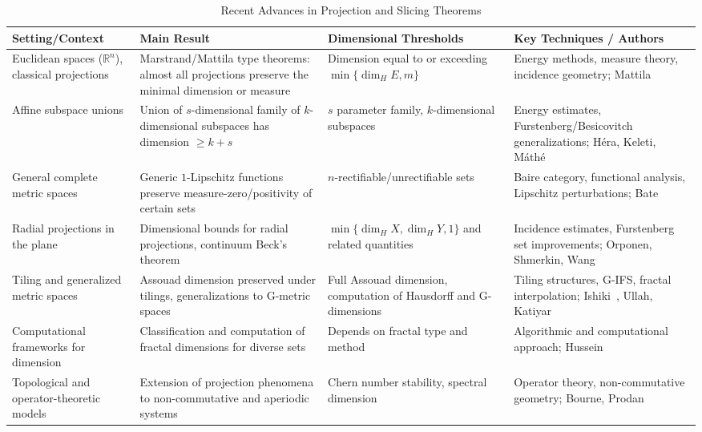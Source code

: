 \documentclass[sigconf]{acmart}
\begin{document}
\begin{table*}[htbp]
\centering
\caption{Recent Advances in Projection and Slicing Theorems}
\label{tab:proj_slice_advances}
\begin{adjustbox}{max width=\textwidth}
\begin{tabular}{@{}llll@{}}
\toprule
\textbf{Setting/Context} & \textbf{Main Result} & \textbf{Dimensional Thresholds} & \textbf{Key Techniques / Authors} \\
\midrule
Euclidean spaces ($\mathbb{R}^n$), classical projections & Marstrand/Mattila type theorems: almost all projections preserve the minimal dimension or measure & Dimension equal to or exceeding $\min\{\dim_H E, m\}$ & Energy methods, measure theory, incidence geometry; Mattila~\cite{ref74} \\
Affine subspace unions & Union of $s$-dimensional family of $k$-dimensional subspaces has dimension $\geq k+s$ & $s$ parameter family, $k$-dimensional subspaces & Energy estimates, Furstenberg/Besicovitch generalizations; Héra, Keleti, Máthé~\cite{ref75} \\
General complete metric spaces & Generic $1$-Lipschitz functions preserve measure-zero/positivity of certain sets & $n$-rectifiable/unrectifiable sets & Baire category, functional analysis, Lipschitz perturbations; Bate~\cite{ref43} \\
Radial projections in the plane & Dimensional bounds for radial projections, continuum Beck’s theorem & $\min\{\dim_H X, \dim_H Y, 1\}$ and related quantities & Incidence estimates, Furstenberg set improvements; Orponen, Shmerkin, Wang~\cite{ref92} \\
Tiling and generalized metric spaces & Assouad dimension preserved under tilings, generalizations to G-metric spaces & Full Assouad dimension, computation of Hausdorff and G-dimensions & Tiling structures, G-IFS, fractal interpolation; Ishiki~\cite{ref1}, Ullah, Katiyar~\cite{ref6} \\
Computational frameworks for dimension & Classification and computation of fractal dimensions for diverse sets & Depends on fractal type and method & Algorithmic and computational approach; Hussein~\cite{ref30} \\
Topological and operator-theoretic models & Extension of projection phenomena to non-commutative and aperiodic systems & Chern number stability, spectral dimension & Operator theory, non-commutative geometry; Bourne, Prodan~\cite{ref23} \\
\bottomrule
\end{tabular}
\end{adjustbox}
\end{table*}
\end{document}
